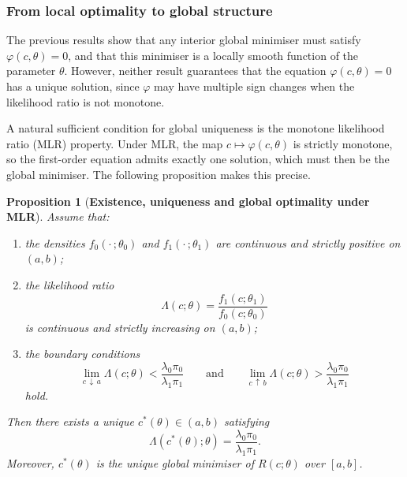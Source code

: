 \documentclass[11pt,a4paper]{article}
\newtheorem{proposition}[theorem]{Proposition}
\theoremstyle{definition}
\theoremstyle{remark}
\newcommand{\1}{\mathbf{1}}
\begin{document}
\subsubsection*{From local optimality to global structure}

The previous results show that any interior global minimiser
must satisfy $\varphi(c,\theta)=0$, and that this minimiser
is a locally smooth function of the parameter $\theta$.
However, neither result guarantees that the equation
$\varphi(c,\theta)=0$ has a unique solution, since
$\varphi$ may have multiple sign changes when the likelihood
ratio is not monotone.

A natural sufficient condition for global uniqueness is the
monotone likelihood ratio (MLR) property.
Under MLR, the map $c\mapsto\varphi(c,\theta)$ is
strictly monotone, so the first-order equation admits exactly
one solution, which must then be the global minimiser.
The following proposition makes this precise.

\begin{proposition}[\textbf{Existence, uniqueness and global optimality under MLR}]
\label{prop:optimal-cutoff}
Assume that:
\begin{enumerate}
    \item the densities $f_0(\cdot\,;\theta_0)$ and
          $f_1(\cdot\,;\theta_1)$ are continuous and strictly
          positive on $(a,b)$;

    \item the likelihood ratio
          \[
          \Lambda(c;\theta)
          =
          \frac{f_1(c;\theta_1)}{f_0(c;\theta_0)}
          \]
          is continuous and strictly increasing on $(a,b)$;

    \item the boundary conditions
          \[
          \lim_{c\,\downarrow\,a}\Lambda(c;\theta)
          <
          \frac{\lambda_0\pi_0}{\lambda_1\pi_1}
          \qquad\text{and}\qquad
          \lim_{c\,\uparrow\,b}\Lambda(c;\theta)
          >
          \frac{\lambda_0\pi_0}{\lambda_1\pi_1}
          \]
          hold.
\end{enumerate}
Then there exists a unique $c^*(\theta)\in(a,b)$ satisfying
\[
\Lambda(c^*(\theta);\theta)
=
\frac{\lambda_0\pi_0}{\lambda_1\pi_1}.
\]
Moreover, $c^*(\theta)$ is the unique global minimiser of
$R(c;\theta)$ over $[a,b]$.
\end{proposition}
\end{document}
